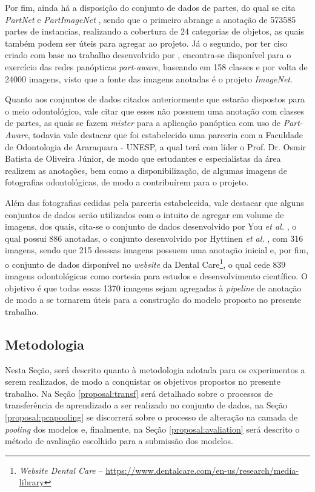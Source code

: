 Por fim, ainda há a disposição do conjunto de dados de partes, do qual se cita \textit{PartNet} \cite{mo2019} e \textit{PartImageNet} \cite{He2021}, sendo que o primeiro abrange a anotação de 573585 partes de instancias, realizando a cobertura de 24 categorias de objetos, as quais também podem ser úteis para agregar ao projeto. Já o segundo, por ter ciso criado com base no trabalho desenvolvido por \cite{DeGeus2021}, encontra-se disponível para o exercício das redes panópticas \textit{part-aware}, baseando em 158 classes e por volta de 24000 imagens, visto que a fonte das imagens anotadas é o projeto \textit{ImageNet}.

Quanto aos conjuntos de dados citados anteriormente que estarão dispostos para o meio odontológico, vale citar que esses não possuem uma anotação com classes de partes, as quais se fazem \textit{mister} para a aplicação panóptica com uso de \textit{Part-Aware}, todavia vale destacar que foi estabelecido uma parceria com a Faculdade de Odontologia de Araraquara - UNESP, a qual terá com líder o Prof. Dr. Osmir Batista de Oliveira Júnior, de modo que estudantes e especialistas da área realizem as anotações, bem como a disponibilização, de algumas imagens de fotografias odontológicas, de modo a contribuírem para o projeto.

Além das fotografias cedidas pela parceria estabelecida, vale destacar que alguns conjuntos de dados serão utilizados com o intuito de agregar em volume de imagens, dos quais, cita-se o conjunto de dados desenvolvido por You \textit{et al.} \cite{You2020}, o qual possui 886 anotadas, o conjunto desenvolvido por Hyttinen \textit{et al.} \cite{Hyttinen2020}, com 316 imagens, sendo que 215 desssas imagens possuem uma anotação inicial e, por fim, o conjunto de dados disponível no \textit{website} da Dental Care\footnote{\textit{Website Dental Care} – \url{https://www.dentalcare.com/en-us/research/media-library}}, o qual cede 839 imagens odontológicas como cortesia para estudos e desenvolvimento científico. O objetivo é que todas essas 1370 imagens sejam agregadas à \textit{pipeline} de anotação de modo a se tornarem úteis para a construção do modelo proposto no presente trabalho.

\subsection{Metodologia}
\label{proposal:methodology}
Nesta Seção, será descrito quanto à metodologia adotada para os experimentos a serem realizados, de modo a conquistar os objetivos propostos no presente trabalho. Na Seção \ref{proposal:transf} será detalhado sobre o processos de transferência de aprendizado a ser realizado no conjunto de dados, na Seção \ref{proposal:pcapooling} se discorrerá sobre o processo de alteração na camada de \textit{pooling} dos modelos e, finalmente, na Seção \ref{proposal:avaliation} será descrito o método de avaliação escolhido para a submissão dos modelos.

